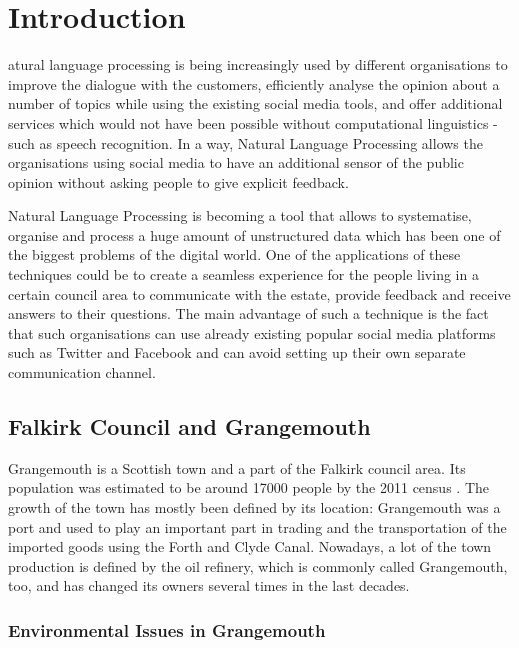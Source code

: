 \let\textcircled=\pgftextcircled
\chapter{Introduction}
\label{chap:intro}

atural language processing is being increasingly used by different organisations to  improve the dialogue with the customers, efficiently analyse the opinion about a number of topics while using the existing social media tools, and offer additional services which would not have been possible without computational linguistics - such as speech recognition. In a way, Natural Language Processing allows the organisations using social media to have an additional sensor of the public opinion without asking people to give explicit feedback.

Natural Language Processing is becoming a tool that allows to systematise, organise and process a huge amount of unstructured data which has been one of the biggest problems of the digital world. One of the applications of these techniques could be to create a seamless experience for the people living in a certain council area to communicate with the estate, provide feedback and receive answers to their questions. The main advantage of such a technique is the fact that such organisations can use already existing popular social media platforms such as Twitter and Facebook and can avoid setting up their own separate communication channel. 


\section{Falkirk Council and Grangemouth}
\label{sec:falkirk}

Grangemouth is a Scottish town and a part of the Falkirk council area. Its population was estimated to be around 17000 people by the 2011 census \cite{falkirkcensus}. The growth of the town has mostly been defined by its location: Grangemouth was a port and used to play an important part in trading and the transportation of the imported goods using the Forth and Clyde Canal. Nowadays, a lot of the town production is defined by the oil refinery, which is commonly called Grangemouth, too, and has changed its owners several times in the last decades. 

\subsection{Environmental Issues in Grangemouth}
\label{subsec:environment}

